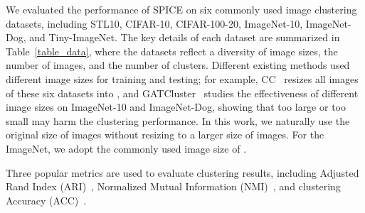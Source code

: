 \documentclass[journal]{IEEEtran}
\begin{document}
\begin{table}[ht]
\footnotesize
\renewcommand{\arraystretch}{1.3}
\caption{Specifications and partitions of selected datasets.}
\label{table_data}
\centering
{}
\end{table}

We evaluated the performance of SPICE on six commonly used image clustering datasets, including
STL10, CIFAR-10, CIFAR-100-20, ImageNet-10, ImageNet-Dog, and Tiny-ImageNet.
The key details of each dataset are summarized in Table~\ref{table_data}, where the datasets reflect a diversity of image sizes, the number of images, and the number of clusters.
Different existing methods used different image sizes for training and testing; for example, CC~\cite{cc} resizes all images of these six datasets into , and GATCluster~\cite{gatcluster} studies the effectiveness of different image sizes on ImageNet-10 and ImageNet-Dog, showing that too large or too small may harm the clustering performance.
In this work, we naturally use the original size of images without resizing to a larger size of images. For the ImageNet, we adopt the commonly used image size of .

Three popular metrics are used to evaluate clustering results, including Adjusted Rand Index (ARI)~\cite{hubert1985comparing}, Normalized Mutual Information (NMI)~\cite{strehl2002clusterensembles}, and clustering Accuracy (ACC)~\cite{LiD06}.
\end{document}
